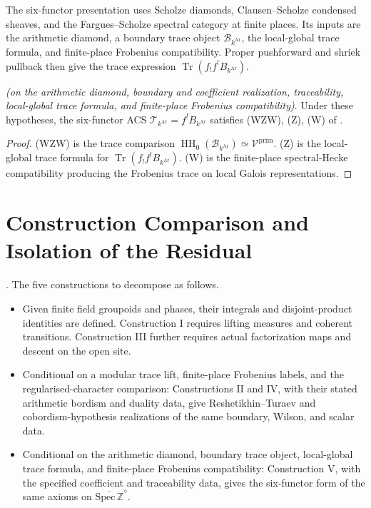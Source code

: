 The six-functor presentation uses Scholze diamonds, Clausen--Scholze
condensed sheaves, and the Fargues--Scholze spectral category at finite
places. Its inputs are the arithmetic diamond, a boundary trace object
\(\mathscr B_{k^{\mathrm{Ar}}}\), the local-global trace formula, and
finite-place Frobenius compatibility. Proper pushforward and shriek
pullback then give the trace expression
\(\operatorname{Tr}(f_!f^!B_{k^{\mathrm{Ar}}})\).

\begin{theorem}
\label{v4-arith:w10-a:thm:construction-V-closure}
\ClaimStatusProvedHereConditional \emph{(on the arithmetic diamond,
boundary and coefficient realization, traceability, local-global
trace formula, and finite-place Frobenius compatibility)}. Under these hypotheses, the six-functor ACS
\(\mathcal T_{k^{\mathrm{Ar}}}=f^{!}B_{k^{\mathrm{Ar}}}\)
satisfies (WZW), (Z), (W) of
.
\end{theorem}

\begin{proof}
(WZW) is the trace comparison
\(\operatorname{HH}_{0}(\mathscr B_{k^{\mathrm{Ar}}})
\simeq\mathcal V^{\mathrm{prim}}\). (Z) is the local-global trace
formula for
\(\operatorname{Tr}(f_{!}f^{!}B_{k^{\mathrm{Ar}}})\). (W) is
the finite-place spectral-Hecke compatibility producing the Frobenius
trace on local Galois representations.
\end{proof}

\section{Construction Comparison and Isolation of the Residual}
\label{v4-arith:w10-a:comparison}

\begin{theorem}
\label{v4-arith:w10-a:thm:construction-comparison}
\ClaimStatusProvedHere. The five constructions to
 decompose as follows.
\begin{itemize}
\item Given finite field groupoids and phases, their integrals and
disjoint-product identities are defined. Construction I requires
lifting measures and coherent transitions. Construction III further
requires actual factorization maps and descent on the open site.
\item Conditional on a modular trace lift, finite-place Frobenius
labels, and the regularised-character comparison: Constructions II and
IV, with their stated arithmetic bordism and duality data, give
Reshetikhin--Turaev and cobordism-hypothesis realizations of
the same boundary, Wilson, and scalar data.
\item Conditional on the arithmetic diamond, boundary trace object,
local-global trace formula, and finite-place Frobenius compatibility:
Construction V, with the specified coefficient and traceability data,
gives the six-functor form of the same axioms on
\(\overline{\mathrm{Spec}\,\mathbb Z}^{\diamond}\).
\end{itemize}
\end{theorem}

